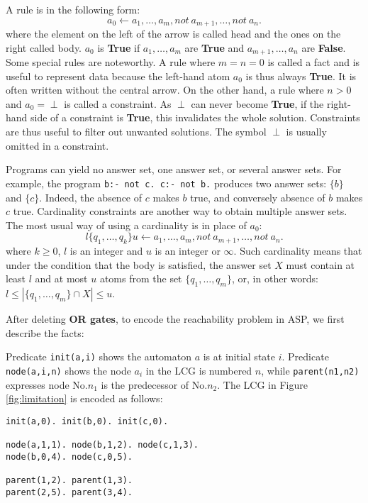 A rule is in the following form:
$$a_0 \gets a_1 , \ldots , a_m, not\ a_{m+1}, \ldots , not\ a_n.$$
where the element on the left of the arrow is called head and the ones on the right called body.
$a_0$ is \textbf{True} if $a_1 , \ldots , a_m$ are \textbf{True} and $a_{m+1}, \ldots , a_n$ are \textbf{False}.
Some special rules are noteworthy. 
A rule where $m = n = 0$ is called a fact and is useful to represent data because the left-hand atom $a_0$ is thus always \textbf{True}.
It is often written without the central arrow.
On the other hand, a rule where $n > 0$ and $a_0 = \perp$ is called a constraint.
As $\perp$ can never become \textbf{True}, if the right-hand side of a constraint is \textbf{True}, this invalidates the whole solution.
Constraints are thus useful to filter out unwanted solutions.
The symbol $\perp$ is usually omitted in a constraint.

Programs can yield no answer set, one answer set, or several answer sets. 
For example, the program \texttt{b:- not c. c:- not b.}  produces two answer sets: $\{b\}$ and $\{c\}$.
Indeed, the absence of $c$ makes $b$ true, and conversely absence of $b$ makes $c$ true. 
Cardinality constraints are another way to obtain multiple answer sets. 
The most usual way of using a cardinality is in place of $a_0$:
$$l \{q_1, \ldots , q_k \} u \gets a_1, \ldots , a_m, not\ a_{m+1}, \ldots , not\ a_n.$$
where $k \geq 0$, $l$ is an integer and $u$ is an integer or $\infty$. 
Such cardinality means that under the condition that the body is satisfied, the answer set $X$ must contain at least $l$ and at most $u$ atoms from the set $\{q_1, \ldots  , q_m\}$, or, in other words: $l \leq |\{q_1, \ldots  , q_m\} \cap X| \leq u$. %

After deleting \textbf{OR gates}, to encode the reachability problem in ASP, we first describe the facts:

Predicate \texttt{init(a,i)} shows the automaton $a$ is at initial state $i$. %
Predicate \texttt{node(a,i,n)} shows the node $a_i$ in the LCG is numbered $n$, while \texttt{parent(n1,n2)} expresses node No.$n_1$ is the predecessor of No.$n_2$.
The LCG in Figure \ref{fig:limitation} is encoded as follows:
\begin{Verbatim}[commandchars=\\\{\}]
init(a,0). init(b,0). init(c,0).

node(a,1,1). node(b,1,2). node(c,1,3).
node(b,0,4). node(c,0,5).

parent(1,2). parent(1,3).
parent(2,5). parent(3,4).
\end{Verbatim}
